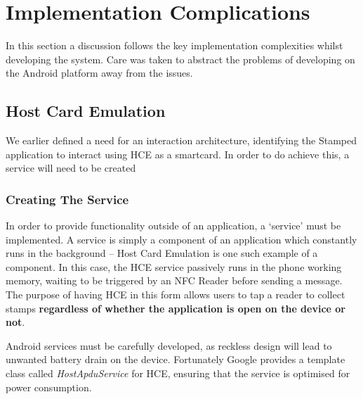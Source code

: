 \section{Implementation Complications}
In this section a discussion follows the key implementation complexities whilst developing the system. Care was taken to abstract the problems of developing on the Android platform away from the issues.
\subsection{Host Card Emulation}
We earlier defined a need for an interaction architecture, identifying the Stamped application to interact using HCE as a smartcard. In order to do achieve this, a service will need to be created 

\newpage{}

\subsubsection{Creating The Service}
In order to provide functionality outside of an application, a `service' must be implemented. A service is simply a component of an application which constantly runs in the background -- Host Card Emulation is one such example of a component. In this case, the HCE service passively runs in the phone working memory, waiting to be triggered by an NFC Reader before sending a message. The purpose of having HCE in this form allows users to tap a reader to collect stamps \textbf{regardless of whether the application is open on the device or not}.

Android services must be carefully developed, as reckless design will lead to unwanted battery drain on the device. Fortunately Google provides a template class called \emph{HostApduService} for HCE, ensuring that the service is optimised for power consumption. 

